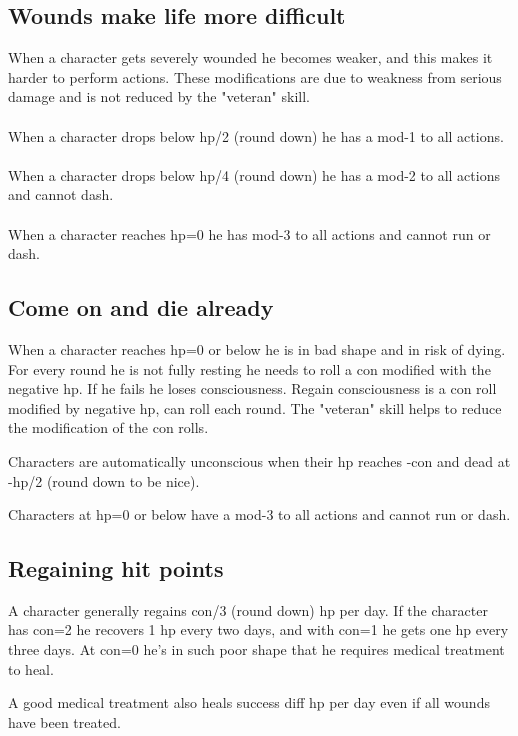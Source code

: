 

\subsection*{Wounds make life more difficult}
When a character gets severely wounded he becomes weaker, and this makes it harder to perform actions. These modifications are due to weakness from serious damage and is not reduced by the "veteran" skill.\\
\\
When a character drops below hp/2 (round down) he has a mod-1 to all actions. \\
\\
When a character drops below hp/4 (round down) he has a mod-2 to all actions and cannot dash. \\
\\
When a character reaches hp=0 he has mod-3 to all actions and cannot run or dash.


\subsection*{Come on and die already}
When a character reaches hp=0 or below he is in bad shape and in risk of dying. For every round he is not fully resting he needs to roll a con modified with the negative hp. If he fails he loses consciousness. Regain consciousness is a con roll modified by negative hp, can roll each round. The "veteran" skill helps to reduce the modification of the con rolls.

Characters are automatically unconscious when their hp reaches -con and dead at -hp/2 (round down to be nice).

Characters at hp=0 or below have a mod-3 to all actions and cannot run or dash.


\subsection*{Regaining hit points}
A character generally regains con/3 (round down) hp per day. If the character has con=2 he recovers 1 hp every two days, and with con=1 he gets one hp every three days. At con=0 he's in such poor shape that he requires medical treatment to heal.

A good medical treatment also heals success diff hp per day even if all wounds have been treated.

